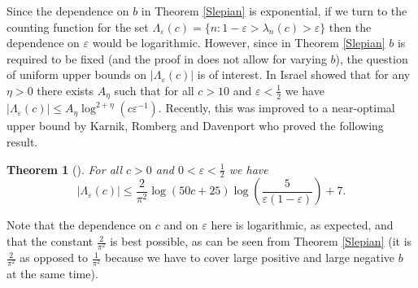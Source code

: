 \documentclass[12pt]{amsart}
\numberwithin{equation}{section}
\newcommand{\eps}{\varepsilon}
\newtheorem{theorem}[Thm]{Theorem}
\begin{document}
Since the dependence on $b$ in Theorem \ref{Slepian} is exponential, if we turn to the counting function for the set $\Lambda_\eps(c) = \{n: 1-\eps > \lambda_n(c) > \eps\}$ then the dependence on $\eps$ would be logarithmic. However, since in Theorem \ref{Slepian} $b$ is required to be fixed (and the proof in \cite{Lan} does not allow for varying $b$), the question of uniform upper bounds on $|\Lambda_\eps(c)|$ is of interest. In \cite{Isr} Israel showed that for any $\eta > 0$ there exists $A_\eta$ such that for all $c > 10$ and $\eps < \frac{1}{2}$ we have $|\Lambda_\eps(c)|\le A_\eta\log^{2+\eta}(c\eps^{-1})$. Recently, this was improved to a near-optimal upper bound by Karnik, Romberg and Davenport \cite{Kar} who proved the following result.
\begin{theorem}[{\cite[Theorem 3]{Kar}}]\label{Karnik}
For all $c > 0$ and $0 < \eps < \frac{1}{2}$ we have
$$|\Lambda_\eps(c)|\le \frac{2}{\pi^2} \log(50c+25)\log\left(\frac{5}{\eps(1-\eps)}\right)+7.$$
\end{theorem}
Note that the dependence on $c$ and on $\eps$ here is logarithmic, as expected, and that the constant $\frac{2}{\pi^2}$ is best possible, as can be seen from Theorem \ref{Slepian} (it is $\frac{2}{\pi^2}$ as opposed to $\frac{1}{\pi^2}$ because we have to cover large positive and large negative $b$ at the same time).
\end{document}
